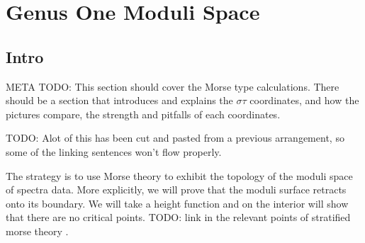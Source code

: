 \section{Genus One Moduli Space}
\label{sec:Moduli Space}


\subsection{Intro}
\label{sub:Intro}

META TODO: This section should cover the Morse type calculations. There should be a section that introduces and explains the $στ$ coordinates, and how the pictures compare, the strength and pitfalls of each coordinates.

TODO: Alot of this has been cut and pasted from a previous arrangement, so some of the linking sentences won't flow properly.

The strategy is to use Morse theory to exhibit the topology of the moduli space of spectra data. More explicitly, we will prove that the moduli surface retracts onto its boundary. We will take a height function and on the interior will show that there are no critical points. TODO: link in the relevant points of stratified morse theory .

